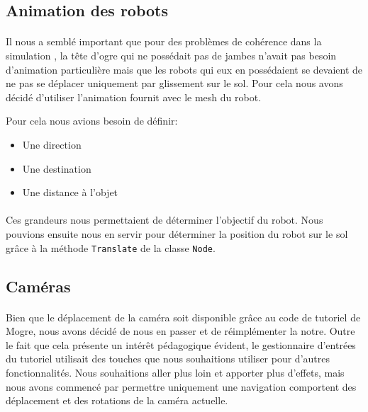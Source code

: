 \subsection{Animation des robots}

\paragraph{}
Il nous a semblé important que pour des problèmes de cohérence dans la
simulation , la tête d'ogre qui ne possédait pas de jambes n'avait pas besoin
d'animation particulière mais que les robots qui eux en possédaient se devaient de
ne pas se déplacer uniquement par glissement sur le sol. Pour cela nous avons
décidé d'utiliser l'animation fournit avec le mesh du robot. 

Pour cela nous avions besoin de définir:\\
\begin{itemize}
  \item Une direction
  \item Une destination
  \item Une distance à l'objet
\end{itemize}

\paragraph{}
Ces grandeurs nous permettaient de déterminer l'objectif du robot. Nous pouvions
ensuite nous en servir pour déterminer la position du robot sur le sol grâce à
la méthode \verb!Translate! de la classe \verb!Node!.

\subsection{Caméras}
\paragraph{}
Bien que le déplacement de la caméra soit disponible grâce au code de tutoriel
de Mogre, nous avons décidé de nous en passer et de réimplémenter la notre.
Outre le fait que cela présente un intérêt pédagogique évident, le gestionnaire
d'entrées du tutoriel utilisait des touches que nous souhaitions utiliser pour
d'autres fonctionnalités. Nous souhaitions aller plus loin et apporter plus
d'effets, mais nous avons commencé par permettre uniquement une navigation
comportent des déplacement et des rotations de la caméra actuelle.

